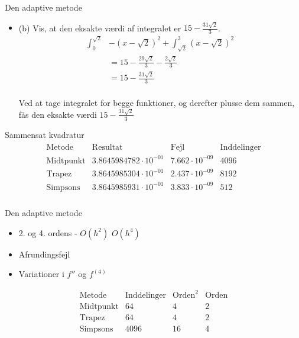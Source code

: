 \begin{frame}{Den adaptive metode}
    \begin{itemize}
        \item (b) Vis, at den eksakte værdi af integralet er $15-\frac{31\sqrt{2}}{3}$.
\begin{align*}
\int^{\sqrt{2}}_0 &-(x-\sqrt{2})^2+\int^3_{\sqrt{2}}(x-\sqrt{2})^2\\
&=15-\frac{29\sqrt{2}}{3}-\frac{2\sqrt{2}}{3} \\
&=15-\frac{31\sqrt{2}}{3} 
\end{align*} \\
            Ved at tage integralet for begge funktioner, og derefter plusse dem sammen, fås den eksakte værdi $15-\frac{31\sqrt{2}}{3}$ \\
    \end{itemize}
\end{frame}



\begin{frame}{Sammensat kvadratur}
\begin{align*}
\begin{array}{l|c|c|c}
\text{Metode} & \text{Resultat}& \text{Fejl} &  \text{Inddelinger} \\
\hline
\text{Midtpunkt}	& 3.8645984782 \cdot 10^{-01} & 7.662 \cdot 10^{-09}	& 4096 \\
\text{Trapez}		& 3.8645985304 \cdot 10^{-01} & 2.437 \cdot 10^{-09} & 8192 \\
\text{Simpsons}		& 3.8645985931 \cdot 10^{-01} & 3.833 \cdot 10^{-09} & 512 \\
\end{array}
\end{align*}
\end{frame}

\begin{frame}{Den adaptive metode}
    \begin{itemize}
        \item 2. og 4. ordens - $O(h^2)$ $O(h^4)$
        \item Afrundingsfejl
        \item Variationer i $f''$ og $f^{(4)}$
    \end{itemize}
    
$$\begin{array}{l|c|c|c}
\text{Metode} & \text{Inddelinger}& \text{Orden}^2 & \text{Orden}\\
\hline
\text{Midtpunkt}	& 64		& 4 	&2\\
\text{Trapez}		& 64		& 4 	&2\\
\text{Simpsons}		& 4096		& 16 	&4\\
\end{array}$$
\end{frame}


